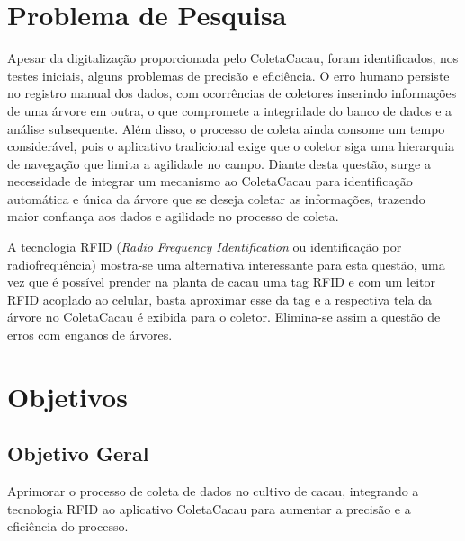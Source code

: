\section{Problema de Pesquisa}
Apesar da digitalização proporcionada pelo ColetaCacau, foram identificados, nos testes iniciais, alguns problemas de precisão e eficiência. O erro humano persiste no registro manual dos dados, com ocorrências de coletores inserindo informações de uma árvore em outra, o que compromete a integridade do banco de dados e a análise subsequente. Além disso, o processo de coleta ainda consome um tempo considerável, pois o aplicativo tradicional exige que o coletor siga uma hierarquia de navegação que limita a agilidade no campo. Diante desta questão, surge a necessidade de integrar um mecanismo ao ColetaCacau para identificação automática e única da árvore que se deseja coletar as informações, trazendo maior confiança aos dados e agilidade no processo de coleta.

A tecnologia RFID (\textit{Radio Frequency Identification} ou identificação por radiofrequência) mostra-se uma alternativa interessante para esta questão, uma vez que é possível prender na planta de cacau uma tag RFID e com um leitor RFID acoplado ao celular, basta aproximar esse da tag e a respectiva tela da árvore no ColetaCacau é exibida para o coletor. Elimina-se assim a questão de erros com enganos de árvores.

\section{Objetivos}

\subsection{Objetivo Geral}
Aprimorar o processo de coleta de dados no cultivo de cacau, integrando a tecnologia RFID ao aplicativo ColetaCacau para aumentar a precisão e a eficiência do processo.

